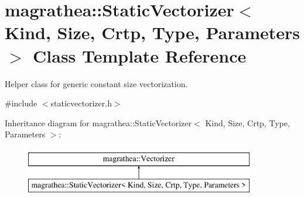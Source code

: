 \hypertarget{classmagrathea_1_1StaticVectorizer}{\section{magrathea\-:\-:Static\-Vectorizer$<$ Kind, Size, Crtp, Type, Parameters $>$ Class Template Reference}
\label{classmagrathea_1_1StaticVectorizer}
}


Helper class for generic constant size vectorization.  




{\ttfamily \#include $<$staticvectorizer.\-h$>$}

Inheritance diagram for magrathea\-:\-:Static\-Vectorizer$<$ Kind, Size, Crtp, Type, Parameters $>$\-:\begin{figure}[H]
\begin{center}
\leavevmode
\includegraphics[height=2.000000cm]{classmagrathea_1_1StaticVectorizer}
\end{center}
\end{figure}
